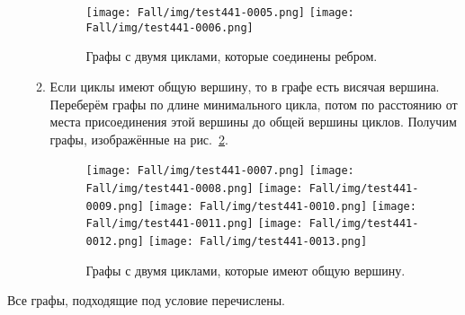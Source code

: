\begin{solution}
\begin{enumerate}
\begin{enumerate}
\begin{figure}[H]
    \centering
    \texttt{[image: Fall/img/test441-0005.png]}
    \texttt{[image: Fall/img/test441-0006.png]}
    \caption{Графы с двумя циклами, которые соединены ребром.}
    \label{fig:441:0005}
\end{figure}

\item 
Если циклы имеют общую вершину, то в графе есть висячая вершина. Переберём графы по длине минимального цикла, потом по расстоянию от места присоединения этой вершины до общей вершины циклов. Получим графы, изображённые на рис.~\ref{fig:441:0007}.

\begin{figure}[H]
    \centering
    \texttt{[image: Fall/img/test441-0007.png]}
    \texttt{[image: Fall/img/test441-0008.png]}
    \texttt{[image: Fall/img/test441-0009.png]}
    \texttt{[image: Fall/img/test441-0010.png]}
    \texttt{[image: Fall/img/test441-0011.png]}
    \texttt{[image: Fall/img/test441-0012.png]}
    \texttt{[image: Fall/img/test441-0013.png]}
    \caption{Графы с двумя циклами, которые имеют общую вершину.}
    \label{fig:441:0007}
\end{figure}


\end{enumerate}
\end{enumerate}
Все графы, подходящие под условие перечислены.

\end{solution}
